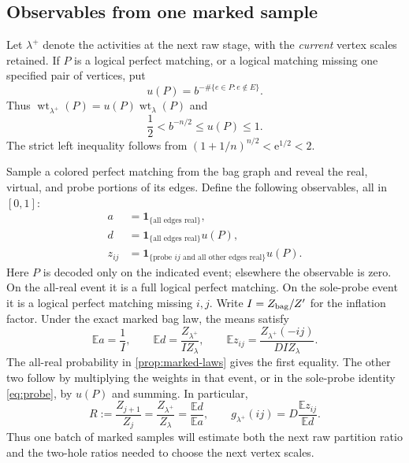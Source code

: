 \documentclass[11pt]{article}
\theoremstyle{definition}
\theoremstyle{remark}
\newcommand{\E}{\mathbb E}
\newcommand{\one}{\mathbf 1}
\newcommand{\wt}{\operatorname{wt}}
\numberwithin{equation}{section}
\begin{document}
\subsection{Observables from one marked sample}
Let $\lambda^+$ denote the activities at the next raw stage, with the
\emph{current} vertex scales retained. If $P$ is a logical perfect
matching, or a logical matching missing one specified pair of vertices,
put
\[
 u(P)=b^{-\#\{e\in P:e\notin E\}}.
\]
Thus $\wt_{\lambda^+}(P)=u(P)\wt_\lambda(P)$ and
\begin{equation}\label{eq:bounded-reweighting}
 \frac12<b^{-n/2}\le u(P)\le1.
\end{equation}
The strict left inequality follows from
$(1+1/n)^{n/2}<\mathrm e^{1/2}<2$.

Sample a colored perfect matching from the bag graph and reveal the
real, virtual, and probe portions of its edges. Define the following
observables, all in $[0,1]$:
\begin{align*}
 a&=\one_{\{\text{all edges real}\}},\\
 d&=\one_{\{\text{all edges real}\}}u(P),\\
 z_{ij}&=\one_{\{\text{probe }ij\text{ and all other edges real}\}}u(P).
\end{align*}
Here $P$ is decoded only on the indicated event; elsewhere the observable
is zero. On the all-real event it is a full logical perfect matching.
On the sole-probe event it is a logical perfect matching missing $i,j$.
Write $I=Z_{\rm bag}/Z'$ for the inflation factor. Under the exact
marked bag law, the means satisfy
\begin{equation}\label{eq:observable-means}
 \E a=\frac1I,\qquad
 \E d=\frac{Z_{\lambda^+}}{I Z_\lambda},\qquad
 \E z_{ij}=\frac{Z_{\lambda^+}(-ij)}{D I Z_\lambda}.
\end{equation}
The all-real probability in \cref{prop:marked-laws} gives the first
equality. The other two follow by multiplying the weights in that event,
or in the sole-probe
identity \eqref{eq:probe}, by $u(P)$ and summing. In particular,
\begin{equation}\label{eq:observable-ratios}
 R:=\frac{Z_{j+1}}{Z_j}
   =\frac{Z_{\lambda^+}}{Z_\lambda}
   =\frac{\E d}{\E a},\qquad
 g_{\lambda^+}(ij)=D\frac{\E z_{ij}}{\E d}.
\end{equation}
Thus one batch of marked samples will estimate both the next raw
partition ratio and the two-hole ratios needed to choose the next
vertex scales.
\end{document}
